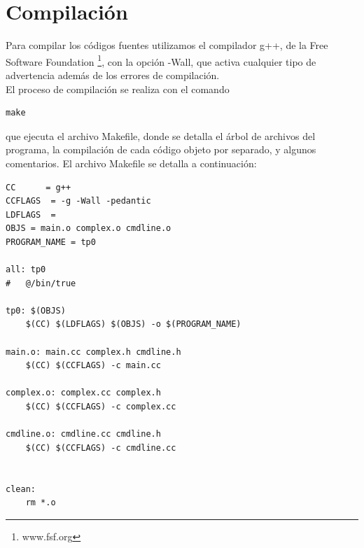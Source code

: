 \documentclass[10pt,a4paper]{article}
\begin{document}
\section{Compilación}
Para compilar los códigos fuentes utilizamos el compilador g++, de la Free Software Foundation \footnote{www.fsf.org}, con la opción -Wall, que activa cualquier tipo de advertencia además de los errores de compilación. \\
El proceso de compilación se realiza con el comando \begin{verbatim}
make
\end{verbatim}
que ejecuta el archivo Makefile, donde se detalla el árbol de archivos del programa, la compilación de cada código objeto por separado, y algunos comentarios. El archivo Makefile se detalla a continuación:\\
\begin{verbatim}
CC      = g++
CCFLAGS  = -g -Wall -pedantic
LDFLAGS  =
OBJS = main.o complex.o cmdline.o
PROGRAM_NAME = tp0

all: tp0
#	@/bin/true

tp0: $(OBJS)
	$(CC) $(LDFLAGS) $(OBJS) -o $(PROGRAM_NAME)

main.o: main.cc complex.h cmdline.h
	$(CC) $(CCFLAGS) -c main.cc

complex.o: complex.cc complex.h
	$(CC) $(CCFLAGS) -c complex.cc
	
cmdline.o: cmdline.cc cmdline.h
	$(CC) $(CCFLAGS) -c cmdline.cc


clean:
	rm *.o
\end{verbatim}
\end{document}
